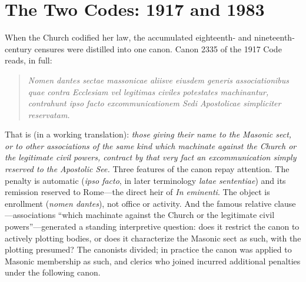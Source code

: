 \section{The Two Codes: 1917 and 1983}

When the Church codified her law, the accumulated eighteenth- and nineteenth-century censures were distilled into one canon. Canon 2335 of the 1917 Code reads, in full:

\begin{quote}
\emph{Nomen dantes sectae massonicae aliisve eiusdem generis associationibus quae contra Ecclesiam vel legitimas civiles potestates machinantur, contrahunt ipso facto excommunicationem Sedi Apostolicae simpliciter reservatam.}
\end{quote}

\noindent
That is (in a working translation): \emph{those giving their name to the Masonic sect, or to other associations of the same kind which machinate against the Church or the legitimate civil powers, contract by that very fact an excommunication simply reserved to the Apostolic See.} Three features of the canon repay attention. The penalty is automatic (\emph{ipso facto}, in later terminology \emph{latae sententiae}) and its remission reserved to Rome---the direct heir of \emph{In eminenti}. The object is enrollment (\emph{nomen dantes}), not office or activity. And the famous relative clause---associations ``which machinate against the Church or the legitimate civil powers''---generated a standing interpretive question: does it restrict the canon to actively plotting bodies, or does it characterize the Masonic sect as such, with the plotting presumed? The canonists divided; in practice the canon was applied to Masonic membership as such, and clerics who joined incurred additional penalties under the following canon.

